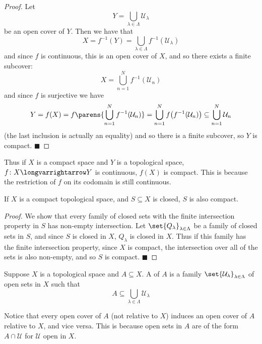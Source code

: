 \documentclass[10pt]{article}
\def\qed{\hskip1cm\penalty-100\hbox{}\hfill$\blacksquare$}
\def\mU{\mathcal{U}}
\def\longto{\longvarrightarrow}
\begin{document}
\begin{proof}

    Let
    \[ Y = \bigcup_{\lambda\in\Lambda}\mU_\lambda \]
    be an open cover of $Y$.
    Then we have that
    \[ X = f^{-1}(Y) = \bigcup_{\lambda\in\Lambda} f^{-1}(\mU_\lambda) \]
    and since $f$ is continuous, this is an open cover of $X$, and so there exists a finite subcover:
    \[ X = \bigcup_{n=1}^N f^{-1}(\mU_n) \]
    and since $f$ is surjective we have
    \[ Y = f(X) = f\parens{\bigcup_{n=1}^N f^{-1}(\mU_n)} = \bigcup_{n=1}^N f\bigl(f^{-1}(\mU_n)\bigr) \subseteq \bigcup_{n=1}^N \mU_n \]
    (the last inclusion is actually an equality) and so there is a finite subcover, so $Y$ is compact.
    \qed

\end{proof}

Thus if $X$ is a compact space and $Y$ is a topological space, $f\colon X\longto Y$ is continuous, $f(X)$ is compact.
This is because the restriction of $f$ on its codomain is still continuous.

\begin{prop*}

    If $X$ is a compact topological space, and $S\subseteq X$ is closed, $S$ is also compact.

\end{prop*}

\begin{proof}

    We show that every family of closed sets with the finite intersection property in $S$ has non-empty intersection.
    Let $\set{Q_\lambda}_{\lambda\in\Lambda}$ be a family of closed sets in $S$, and since $S$ is closed in $X$, $Q_\lambda$ is closed in $X$.
    Thus if this family has the finite intersection property, since $X$ is compact, the intersection over all of the sets is also non-empty, and so $S$ is compact.
    \qed

\end{proof}

\begin{defn*}

    Suppose $X$ is a topological space and $A\subseteq X$.
    A  of $A$ is a family $\set{\mU_\lambda}_{\lambda\in\Lambda}$ of open sets in $X$ such that
    \[ A \subseteq\bigcup_{\lambda\in\Lambda}\mU_\lambda \]

\end{defn*}

Notice that every open cover of $A$ (not relative to $X$) induces an open cover of $A$ relative to $X$, and vice versa.
This is because open sets in $A$ are of the form $A\cap\mU$ for $\mU$ open in $X$.
\end{document}
